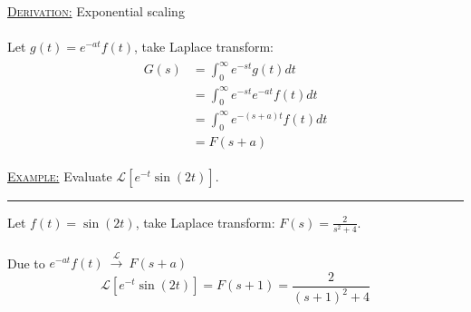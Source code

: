 \documentclass[12pt,a4paper]{article}
\begin{document}
\begin{tcolorbox}[breakable]
\underline{\textsc{Derivation:}} Exponential scaling\\\\
Let $g(t)=e^{-at}f(t)$, take Laplace transform:
\begin{align*} \begin{split}
G(s) &= \int_{0}^{\infty}e^{-st}g(t) dt\\
&=\int_{0}^{\infty}e^{-st}e^{-at}f(t) dt\\
&= \int_{0}^{\infty}e^{-(s+a)t}f(t) dt\\
&= F(s+a)
\end{split} \end{align*}
\end{tcolorbox}

\begin{tcolorbox}[breakable]
\underline{\textsc{Example:}} Evaluate $\mathcal{L}[e^{-t}\sin(2t)]$.
\vspace{.3cm} \hrule \vspace{.3cm} 
Let $f(t) = \sin(2t)$, take Laplace transform: $F(s) = \frac{2}{s^{2}+4}$.\\\\
Due to $e^{-at}f(t) \ \xrightarrow{\mathcal{L}}  \ F(s+a)$
\[\mathcal{L}[e^{-t}\sin(2t)] = F(s+1) = \frac{2}{(s+1)^{2}+4}\]
\end{tcolorbox}


\newpage
\end{document}
